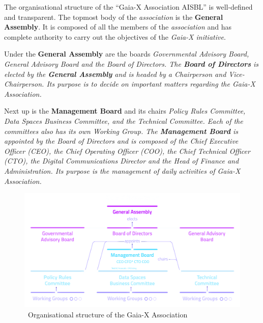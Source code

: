 The organisational structure of the ``Gaia-X Association AISBL'' is well-defined and transparent.
The topmost body of the \textit{association} is the \textbf{General Assembly}.
It is composed of all the members of the \textit{association} and has complete authority to carry out the objectives of the \textit{Gaia-X initiative}.~\cite{gaiax}

Under the \textbf{General Assembly} are the boards \em \textit{Governmental Advisory Board}, \textit{General Advisory Board} and the \textit{Board of Directors}.
The \textbf{Board of Directors} is elected by the \textbf{General Assembly} and is headed by a Chairperson and Vice-Chairperson. %
Its purpose is to decide on important matters regarding the \textit{Gaia-X Association}.~\cite{gaiax} %

Next up is the \textbf{Management Board} and its chairs \em \textit{Policy Rules Committee}, \textit{Data Spaces Business Committee}, and the \textit{Technical Committee}.
Each of the committees also has its own \textit{Working Group}.
The \textbf{Management Board} is appointed by the \textit{Board of Directors} and is composed of the Chief Executive Officer (CEO), the Chief Operating Officer (COO), the Chief Technical Officer (CTO), the Digital Communications Director and the Head of Finance and Administration.
Its purpose is the management of daily activities of \textit{Gaia-X Association}.~\cite{gaiax}

\begin{figure}
    \centering
    \includegraphics[width=\textwidth]{assets/management-board-structure}
    \caption{~Organisational structure of the Gaia-X Association~\cite{gaiax}}\label{fig:organisational-board-structure}
\end{figure}

